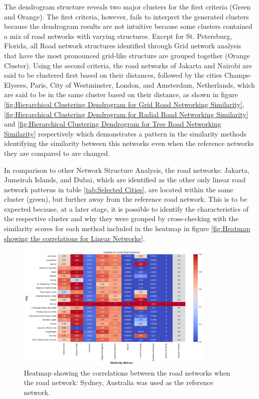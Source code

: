 The dendrogram structure reveals two major clusters for the first criteria (Green and Orange). The first criteria, however, fails to interpret the generated clusters because the dendrogram results are not intuitive because some clusters contained a mix of road networks with varying structures. Except for St. Petersburg, Florida, all Road network structures identified through Grid network analysis that have the most pronounced grid-like structure are grouped together (Orange Cluster). Using the second criteria, the road networks of Jakarta and Nairobi are said to be clustered first based on their distances, followed by the cities Champs-Elysees, Paris, City of Westminster, London, and Amsterdam, Netherlands, which are said to be in the same cluster based on their distance, as shown in figure \ref{fig:Hierarchical Clustering Dendrogram for Grid Road Networking Similarity}, \ref{fig:Hierarchical Clustering Dendrogram for Radial Road Networking Similarity} and \ref{fig:Hierarchical Clustering Dendrogram for Tree Road Networking Similarity} respectively which demonstrates a pattern in the similarity methods identifying the similarity between this networks even when the reference networks they are compared to are changed.

In comparison to other Network Structure Analysis, the road networks: Jakarta, Jumeirah Islands, and Dubai, which are identified as the other only linear road network patterns in table \ref{tab:Selected Cities}, are located within the same cluster (green), but further away from the reference road network. This is to be expected because, at a later stage, it is possible to identify the characteristics of the respective cluster and why they were grouped by cross-checking with the similarity scores for each method included in the heatmap in figure \ref{fig:Heatmap showing the correlations for Linear Networks}.

\begin{figure}[!ht]
\centering
\includegraphics[width=0.85\textwidth,center]{picture/Linear/linearheatmap.png}
\caption[Heatmap showing the correlations for Linear Road Networks]{Heatmap showing the correlations between the road networks when the road network: Sydney, Australia was used as the reference network.}
\label{fig:Heatmap showing the correlations for Linear Road Networks}
\end{figure}

